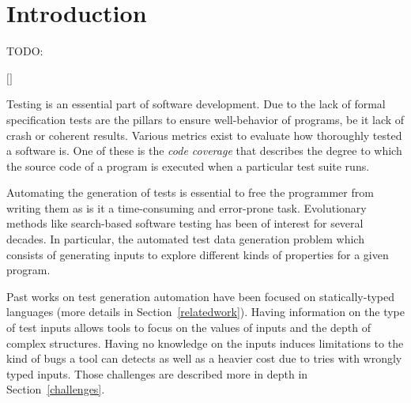\documentclass{llncs2e/llncs}
\def\todo#1{{\color{red}TODO:\quad#1}}
\def\addref#1{{\color{red}$[$#1$]$}}
\begin{document}
\vfill

\begin{abstract}
  \todo{}
Despite popular usage, most of the dynamically typed languages still lack
automated test data generation tools.  Most of the existing tools and
approaches depend critically on static and explicit types, which makes it hard
to port any of them over to dynamically typed languages. In this paper we
present a search-based test data generation tool, NAME, which focuses on
primitive types and lists of Python. NAME not only searches for test input
values but also for appropriate types for each input argument. We evaluate NAME
based on the structural coverage it achieves, the cost of the type search, and
the overhead for the execution of the function under test. We further discuss
the future of automated testing for dynamic and object-oriented languages based
on our experience.
\end{abstract}
%
\newpage


\section{Introduction}
\todo{}

\addref{}

Testing is an essential part of software development. Due to the lack of formal
specification tests are the pillars to ensure well-behavior of programs, be it
lack of crash or coherent results. Various metrics exist to evaluate how
thoroughly tested a software is. One of these is the \textit{code coverage} that
describes the degree to which the source code of a program is executed when a
particular test suite runs.

Automating the generation of tests is essential to free the programmer from
writing them as is it a time-consuming and error-prone task. Evolutionary
methods like search-based software testing has been of interest for several
decades. In particular, the automated test data generation problem which
consists of generating inputs to explore different kinds of properties for a
given program.

Past works on test generation automation have been focused on statically-typed
languages (more details in Section~\ref{relatedwork}). Having information on the
type of test inputs allows tools to focus on the values of inputs and the depth
of complex structures. Having no knowledge on the inputs induces limitations to
the kind of bugs a tool can detects as well as a heavier cost due to tries with
wrongly typed inputs. Those challenges are described more in depth in
Section~\ref{challenges}.
\end{document}
